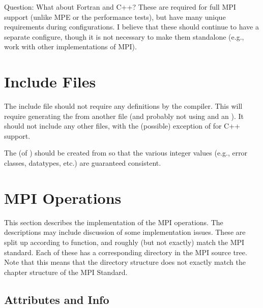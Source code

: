 \documentclass{article}
\begin{document}
Question: What about Fortran and C++?  These are required for full MPI support
(unlike MPE or the performance tests), but have many unique requirements
during configurations.  I believe that these should continue to have a
separate configure, though it is not necessary to make them standalone (e.g.,
work with other implementations of MPI).

\section{Include Files}
The include file  should not require any 
definitions by the compiler.  This will require generating the
 from another file (and probably not using  and an
).  It should not include any other
files, with the (possible) exception of  for C++ support.

The  (of ) should be created from
 so that the various integer values (e.g., error classes,
datatypes, etc.) are guaranteed consistent.

\section{MPI Operations}
This section describes the implementation of the MPI operations.  The
descriptions may include discussion of some implementation issues.
These are split up according to function, and roughly (but not
exactly) match the MPI standard.  Each of these has a corresponding
directory in the MPI source tree.  Note that this means that the
directory structure does not exactly match the chapter structure of
the MPI Standard.

\subsection{Attributes and Info}

\subsubsection{}
\subsubsection{}
\subsubsection{}
\end{document}
